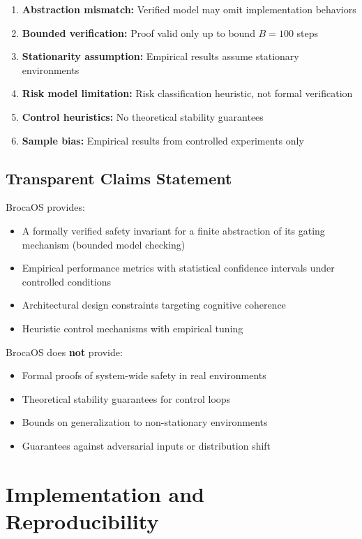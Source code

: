 \documentclass[12pt]{article}
\theoremstyle{definition}
\begin{document}
\begin{enumerate}
    \item \textbf{Abstraction mismatch:} Verified model may omit implementation behaviors
    \item \textbf{Bounded verification:} Proof valid only up to bound $B=100$ steps
    \item \textbf{Stationarity assumption:} Empirical results assume stationary environments
    \item \textbf{Risk model limitation:} Risk classification heuristic, not formal verification
    \item \textbf{Control heuristics:} No theoretical stability guarantees
    \item \textbf{Sample bias:} Empirical results from controlled experiments only
\end{enumerate}

\subsection{Transparent Claims Statement}

BrocaOS provides:
\begin{itemize}
    \item A formally verified safety invariant for a finite abstraction of its gating mechanism (bounded model checking)
    \item Empirical performance metrics with statistical confidence intervals under controlled conditions
    \item Architectural design constraints targeting cognitive coherence
    \item Heuristic control mechanisms with empirical tuning
\end{itemize}

\noindent
BrocaOS does \textbf{not} provide:
\begin{itemize}
    \item Formal proofs of system-wide safety in real environments
    \item Theoretical stability guarantees for control loops
    \item Bounds on generalization to non-stationary environments
    \item Guarantees against adversarial inputs or distribution shift
\end{itemize}

\section{Implementation and Reproducibility}
\end{document}
